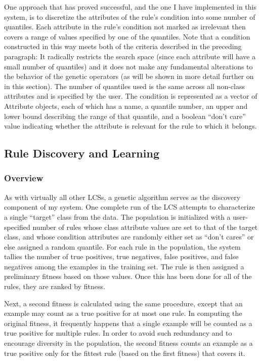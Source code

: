 \documentclass[11pt]{article}
\begin{document}
One approach that has proved successful, and the one I have implemented in this system, is to discretize the attributes of the rule’s condition into some number of quantiles. Each attribute in the rule’s condition not marked as irrelevant then covers a range of values specified by one of the quantiles. Note that a condition constructed in this way meets both of the criteria described in the preceding paragraph: It radically restricts the search space (since each attribute will have a small number of quantiles) and it does not make any fundamental alterations to the behavior of the genetic operators (as will be shown in more detail further on in this section). The number of quantiles used is the same across all non-class attributes and is specified by the user. The condition is represented as a vector of Attribute objects, each of which has a name, a quantile number, an upper and lower bound describing the range of that quantile, and a boolean ``don’t care'' value indicating whether the attribute is relevant for the rule to which it belongs.

\subsection{Rule Discovery and Learning}

\subsubsection*{Overview}

As with virtually all other LCSs, a genetic algorithm serves as the discovery component of my system. One complete run of the LCS attempts to characterize a single ``target'' class from the data. The population is initialized with a user-specified number of rules whose class attribute values are set to that of the target class, and whose condition attributes are randomly either set as ``don’t cares'' or else assigned a random quantile. For each rule in the population, the system tallies the number of true positives, true negatives, false positives, and false negatives among the examples in the training set. The rule is then assigned a preliminary fitness based on those values. Once this has been done for all of the rules, they are ranked by fitness. 

Next, a second fitness is calculated using the same procedure, except that an example may count as a true positive for at most one rule. In computing the original fitness, it frequently happens that a single example will be counted as a true positive for multiple rules. In order to avoid such redundancy and to encourage diversity in the population, the second fitness counts an example as a true positive only for the fittest rule (based on the first fitness) that covers it. 
\end{document}
